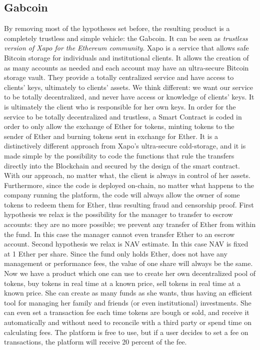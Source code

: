 \documentclass[9pt,oneside]{amsart}
\begin{document}
\begin{multicols}{2}
\section{Gabcoin} \label{ch:minimum}
By removing most of the hypotheses set before, the resulting product is a completely trustless and simple vehicle: the Gabcoin. It can be seen as  \textit{trustless version of Xapo for the Ethereum community}. 
Xapo is a service that allows safe Bitcoin storage for individuals and institutional clients. It allows the creation of as many accounts as needed and each account may have an ultra-secure Bitcoin storage vault. They provide a totally centralized service and have access to clients' keys, ultimately to clients' assets.
We think different: we want our service to be totally decentralized, and never have access or knowledge of clients' keys. It is ultimately the client who is responsible for her own keys. In order for the service to be totally decentralized and trustless,  a Smart Contract is coded in order to only allow the exchange of Ether for tokens, minting tokens to the sender of Ether and burning tokens sent in exchange for Ether. It is a distinctively different approach from Xapo's ultra-secure cold-storage, and it is made simple by the possibility to code the functions that rule the transfers directly into the Blockchain and secured by the design of the smart contract. With our approach, no matter what, the client is always in control of her assets. Furthermore, since the code is deployed on-chain, no matter what happens to the company running the platform, the code will always allow the owner of some tokens to redeem them for Ether, thus resulting fraud and censorship proof.
First hypothesis we relax is the possibility for the manager to transfer to escrow accounts: they are no more possible; we prevent any transfer of Ether from within the fund. In this case the manager cannot even transfer Ether to an escrow account.
Second hypothesis we relax is NAV estimate. In this case NAV is fixed at 1 Ether per share. Since the fund only holds Ether, does not have any management or performance fees, the value of one share will always be the same. Now we have a product which one can use to create her own decentralized pool of tokens, buy tokens in real time at a known price, sell tokens in real time at a known price. She can create as many funds as she wants, thus having an efficient tool for managing her family and friends (or even institutional) investments. She can even set a transaction fee each time tokens are bough or sold, and receive it automatically and without need to reconcile with a third party or spend time on calculating fees. The platform is free to use, but if a user decides to set a fee on transactions, the platform will receive 20 percent of the fee.

\end{multicols}
\end{document}
